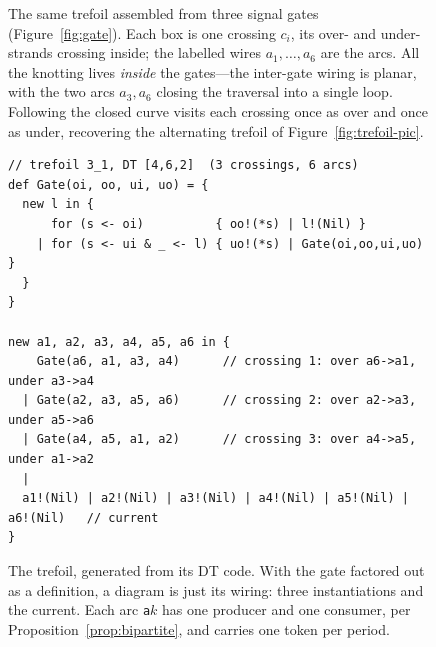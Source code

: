 \documentclass[11pt]{article}
\theoremstyle{definition}
\begin{document}
\begin{figure}[htb]
\centering
{}
\caption{The same trefoil assembled from three signal gates
(Figure~\ref{fig:gate}). Each box is one crossing $c_i$, its over- and under-strands
crossing inside; the labelled wires $a_1,\dots,a_6$ are the arcs. All the knotting
lives \emph{inside} the gates---the inter-gate wiring is planar, with the two arcs
$a_3,a_6$ closing the traversal into a single loop. Following the closed curve visits
each crossing once as over and once as under, recovering the alternating trefoil of
Figure~\ref{fig:trefoil-pic}.}
\label{fig:trefoil-gates}
\end{figure}

\begin{figure}[t]
\begin{lstlisting}
// trefoil 3_1, DT [4,6,2]  (3 crossings, 6 arcs)
def Gate(oi, oo, ui, uo) = {
  new l in {
      for (s <- oi)          { oo!(*s) | l!(Nil) }
    | for (s <- ui & _ <- l) { uo!(*s) | Gate(oi,oo,ui,uo) }
  }
}

new a1, a2, a3, a4, a5, a6 in {
    Gate(a6, a1, a3, a4)      // crossing 1: over a6->a1, under a3->a4
  | Gate(a2, a3, a5, a6)      // crossing 2: over a2->a3, under a5->a6
  | Gate(a4, a5, a1, a2)      // crossing 3: over a4->a5, under a1->a2
  |
  a1!(Nil) | a2!(Nil) | a3!(Nil) | a4!(Nil) | a5!(Nil) | a6!(Nil)   // current
}
\end{lstlisting}
\caption{The trefoil, generated from its DT code. With the gate factored out as a
definition, a diagram is just its wiring: three instantiations and the current.
Each arc \texttt{a$k$} has one producer and one consumer, per
Proposition~\ref{prop:bipartite}, and carries one token per period.}
\label{fig:trefoil}
\end{figure}
\end{document}

